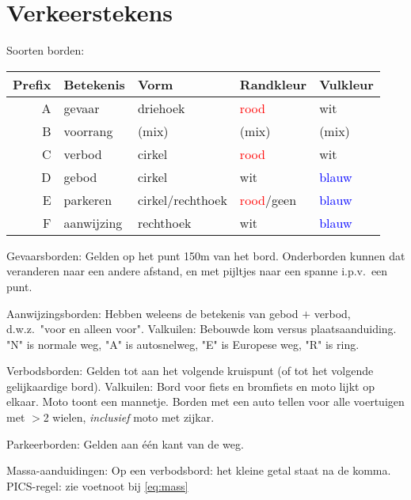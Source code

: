 \section{Verkeerstekens}
\begin{outline}
\1 Soorten borden:
\begin{center}
\begin{tabular}{r|llll}
	Prefix & Betekenis & Vorm & Randkleur & Vulkleur \\ \hline
	A & gevaar & driehoek & \textcolor{red}{rood} & wit \\
	B & voorrang & (mix) & (mix) & (mix) \\
	C & verbod & cirkel & \textcolor{red}{rood} & wit \\
	D & gebod & cirkel & wit & \textcolor{blue}{blauw} \\
	E & parkeren & cirkel/rechthoek & \textcolor{red}{rood}/geen & \textcolor{blue}{blauw} \\ 
	F & aanwijzing & rechthoek & wit & \textcolor{blue}{blauw}
\end{tabular}
\end{center}

\1 Gevaarsborden:
	\2 Gelden op het punt 150m van het bord.
	\2 Onderborden kunnen dat veranderen naar een andere afstand, en met pijltjes naar een spanne i.p.v.\ een punt.
	
\1 Aanwijzingsborden:
	\2 Hebben weleens de betekenis van gebod $+$ verbod, d.w.z.\ "voor en alleen voor".
	\2 Valkuilen:
		\3 Bebouwde kom versus plaatsaanduiding.
		\3 "N" is normale weg, "A" is autosnelweg, "E" is Europese weg, "R" is ring.

\1 Verbodsborden:
	\2 Gelden tot aan het volgende kruispunt (of tot het volgende gelijkaardige bord).
	\2 Valkuilen:
		\3 Bord voor fiets en bromfiets en moto lijkt op elkaar. Moto toont een mannetje.
		\3 Borden met een auto tellen voor alle voertuigen met $>$2 wielen, \emph{inclusief} moto met zijkar.

\1 Parkeerborden:
	\2 Gelden aan één kant van de weg.
	
\1 Massa-aanduidingen:
	\2 Op een verbodsbord: het kleine getal staat na de komma.
	\2 PICS-regel: zie voetnoot bij \autoref{eq:mass}
\end{outline}

